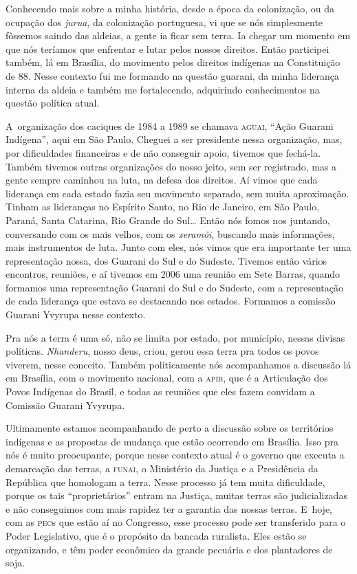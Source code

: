 Conhecendo mais sobre a minha história, desde a época da colonização, ou
da ocupação dos \emph{jurua}, da colonização portuguesa, vi que se nós
simplesmente fôssemos saindo das aldeias, a gente ia ficar sem terra.
Ia chegar um momento em que nós teríamos que enfrentar e lutar pelos
nossos direitos. Então participei também, lá em Brasília, do movimento
pelos direitos indígenas na Constituição de 88. Nesse contexto fui me
formando na questão guarani, da minha liderança interna da aldeia e
também me fortalecendo, adquirindo conhecimentos na questão política
atual.

A~organização dos caciques de 1984 a 1989 se chamava \textsc{aguai}, ``Ação
Guarani Indígena'', aqui em São Paulo. Cheguei a ser presidente nessa
organização, mas, por dificuldades financeiras e de não conseguir
apoio, tivemos que fechá-la. Também tivemos outras organizações do
nosso jeito, sem ser registrado, mas a gente sempre caminhou na luta,
na defesa dos direitos. Aí vimos que cada liderança em cada estado
fazia seu movimento separado, sem muita aproximação. Tinham as
lideranças no Espírito Santo, no Rio de Janeiro, em São Paulo, Paraná,
Santa Catarina, Rio Grande do Sul\ldots{} Então nós fomos nos juntando,
conversando com os mais velhos, com os \emph{xeramõi}, buscando mais
informações, mais instrumentos de luta. Junto com eles, nós vimos que
era importante ter uma representação nossa, dos Guarani do Sul e do
Sudeste. Tivemos então vários encontros, reuniões, e aí tivemos em 2006
uma reunião em Sete Barras, quando formamos uma representação Guarani
do Sul e do Sudeste, com a representação de cada liderança que estava
se destacando nos estados. Formamos a comissão Guarani Yvyrupa nesse
contexto. 

Pra nós a terra é uma só, não se limita por estado, por município,
nessas divisas políticas. \emph{Nhanderu}, nosso deus, criou, gerou essa terra
pra todos os povos viverem, nesse conceito. Também politicamente nós
acompanhamos a discussão lá em Brasília, com o movimento nacional, com
a \textsc{apib}, que é a Articulação dos Povos Indígenas do Brasil, e todas as
reuniões que eles fazem convidam a Comissão Guarani Yvyrupa.

Ultimamente estamos acompanhando de perto a discussão sobre os
territórios indígenas e as propostas de mudança que estão ocorrendo em
Brasília. Isso pra nós é muito preocupante, porque nesse contexto atual
é o governo que executa a demarcação das terras, a \textsc{funai}, o Ministério
da Justiça e a Presidência da República que homologam a terra. Nesse
processo já tem muita dificuldade, porque os tais ``proprietários''
entram na Justiça, muitas terras são judicializadas e não conseguimos
com mais rapidez ter a garantia das nossas terras. E~hoje, com as \textsc{pec}s
que estão aí no Congresso, esse processo pode ser transferido para o
Poder Legislativo, que é o propósito da bancada ruralista. Eles estão
se organizando, e têm poder econômico da grande pecuária e dos
plantadores de soja. 

